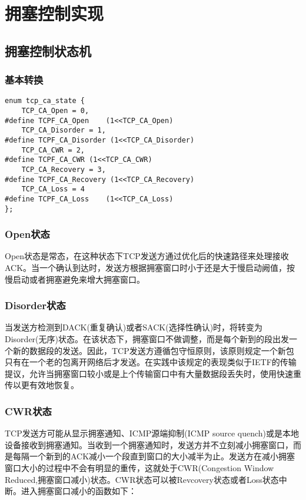\section{拥塞控制实现}

	\subsection{拥塞控制状态机}
		\subsubsection{基本转换}
\begin{verbatim}
enum tcp_ca_state {
	TCP_CA_Open = 0,
#define TCPF_CA_Open	(1<<TCP_CA_Open)
	TCP_CA_Disorder = 1,
#define TCPF_CA_Disorder (1<<TCP_CA_Disorder)
	TCP_CA_CWR = 2,
#define TCPF_CA_CWR	(1<<TCP_CA_CWR)
	TCP_CA_Recovery = 3,
#define TCPF_CA_Recovery (1<<TCP_CA_Recovery)
	TCP_CA_Loss = 4
#define TCPF_CA_Loss	(1<<TCP_CA_Loss)
};
\end{verbatim}
		\subsubsection{Open状态}
			Open状态是常态，在这种状态下TCP发送方通过优化后的快速路径来处理接收ACK。当一个确认到达时，发送方根据拥塞窗口时小于还是大于慢启动阙值，按慢启动或者拥塞避免来增大拥塞窗口。

		\subsubsection{Disorder状态}
			当发送方检测到DACK(重复确认)或者SACK(选择性确认)时，将转变为Disorder(无序)状态。在该状态下，拥塞窗口不做调整，而是每个新到的段出发一个新的数据段的发送。因此，TCP发送方遵循包守恒原则，该原则规定一个新包只有在一个老的包离开网络后才发送。在实践中该规定的表现类似于IETF的传输提议，允许当拥塞窗口较小或是上个传输窗口中有大量数据段丢失时，使用快速重传以更有效地恢复。

		\subsubsection{CWR状态}
			TCP发送方可能从显示拥塞通知、ICMP源端抑制(ICMP source quench)或是本地设备接收到拥塞通知。当收到一个拥塞通知时，发送方并不立刻减小拥塞窗口，而是每隔一个新到的ACK减小一个段直到窗口的大小减半为止。发送方在减小拥塞窗口大小的过程中不会有明显的重传，这就处于CWR(Congestion Window Reduced,拥塞窗口减小)状态。CWR状态可以被Revcovery状态或者Loss状态中断。进入拥塞窗口减小的函数如下：

